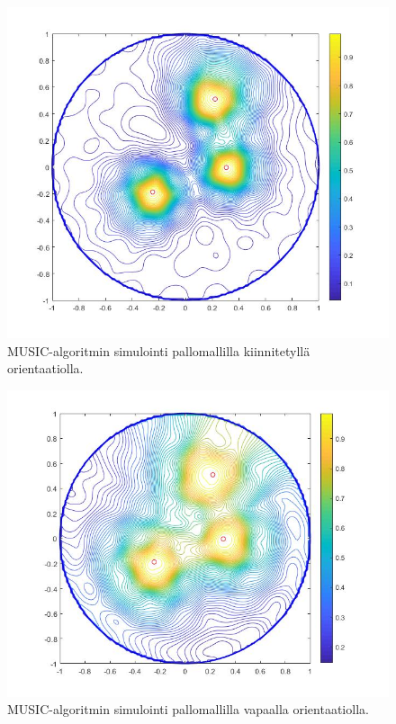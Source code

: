 \clearpage
\begin{figure}[h]
    \centering
    \includegraphics[scale=0.38]{mfix.jpg}
    \caption{MUSIC-algoritmin simulointi pallomallilla kiinnitetyllä orientaatiolla.}
    \label{fig:mfix}
\end{figure}

\begin{figure}[h]
    \centering
    \includegraphics[scale=0.4]{mfree.jpg}
    \caption{MUSIC-algoritmin simulointi pallomallilla vapaalla orientaatiolla.}
    \label{fig:mfree}
\end{figure}

